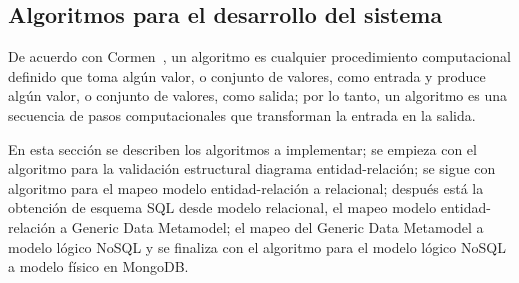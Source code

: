




\subsection{Algoritmos para el desarrollo del sistema}

De acuerdo con Cormen~\cite{cormen_introduction_2009}, un algoritmo es cualquier procedimiento computacional definido que toma algún valor, o conjunto de valores, como entrada y produce algún valor, o conjunto de valores, como salida; por lo tanto, un algoritmo es una secuencia de pasos computacionales que transforman la entrada en la salida.


En esta sección se describen los algoritmos a implementar; se empieza con el algoritmo para la validación estructural diagrama entidad-relación; se sigue con algoritmo para el mapeo modelo entidad-relación a relacional; después está la obtención de esquema SQL desde modelo relacional, el mapeo modelo entidad-relación a Generic Data Metamodel; el mapeo del Generic Data Metamodel a modelo lógico NoSQL y se finaliza con el algoritmo para el modelo lógico NoSQL a modelo físico en MongoDB.






